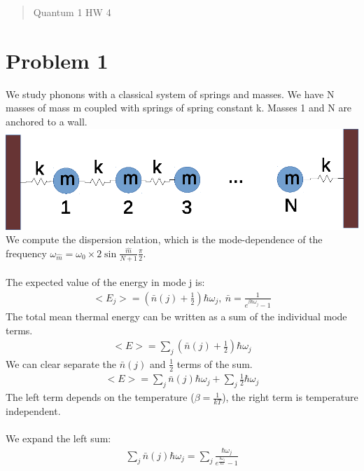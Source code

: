 \documentclass[a4paper,10pt]{article}
\title{}
\author{Vince Baker}
\numberwithin{equation}{section}
\begin{document}
\maketitle

\begin{abstract}
Quantum 1 HW 4
\end{abstract}

\section{Problem 1}
We study phonons with a classical system of springs and masses. 
We have N masses of mass m coupled with springs of spring constant k.
Masses 1 and N are anchored to a wall.\\
\includegraphics{p1}
\\
We compute the dispersion relation, which is the mode-dependence of the frequency $\omega_{\hat{m}}=\omega_0\times2\sin{\frac{\hat{m}}{N+1}\frac{\pi}{2}}$.
\\ \\
The expected value of the energy in mode j is:
\begin{gather}
 <E_j>=(\bar{n}(j)+\frac{1}{2})\hbar \omega_j,\ \bar{n}=\frac{1}{e^{\beta\hbar \omega_j}-1}
\end{gather}
The total mean thermal energy can be written as a sum of the individual mode terms.
\begin{gather}
 <E>=\sum_j(\bar{n}(j)+\frac{1}{2})\hbar \omega_j
\end{gather}
We can clear separate the $\bar{n}(j)$ and $\frac{1}{2}$ terms of the sum.
\begin{gather}
 <E>=\sum_j\bar{n}(j)\hbar \omega_j+\sum_j \frac{1}{2}\hbar \omega_j
\end{gather}
The left term depends on the temperature ($\beta=\frac{1}{kT}$), the right term is temperature independent.\\ \\
We expand the left sum:
\begin{gather}
 \sum_j\bar{n}(j)\hbar \omega_j=\sum_j \frac{\hbar \omega_j}{e^{\frac{\hbar \omega_j}{kT}}-1}
\end{gather}
\end{document}
